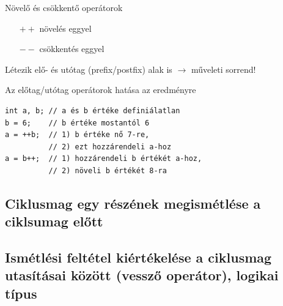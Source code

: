 \documentclass[usenames,dvipsnames,aspectratio=169]{beamer}
\begin{document}
\begin{frame}[fragile]
  Növelő és csökkentő operátorok
  \begin{itemize}
    \item[\texttt{$++$}] növelés eggyel
    \item[\texttt{$--$}] csökkentés eggyel
  \end{itemize}
  Létezik elő- és utótag (prefix/postfix) alak is $\to$ műveleti sorrend!
  \vfill
  \begin{block}{Az előtag/utótag operátorok hatása az eredményre}
    \vspace{-.3cm}
    \begin{verbatim}
int a, b; // a és b értéke definiálatlan
b = 6;    // b értéke mostantól 6
a = ++b;  // 1) b értéke nő 7-re, 
          // 2) ezt hozzárendeli a-hoz
a = b++;  // 1) hozzárendeli b értékét a-hoz,
          // 2) növeli b értékét 8-ra
    \end{verbatim}
    \vspace{-.6cm}
  \end{block}
\end{frame}

\subsection{Ciklusmag egy részének megismétlése a ciklsumag előtt}
\begin{frame}
  \begin{exampleblock}{}
    \vspace{-.2cm}
    
    \vspace{-.2cm}
  \end{exampleblock}
\end{frame}

\subsection{Ismétlési feltétel kiértékelése a ciklusmag utasításai között (vessző operátor), logikai típus}
\begin{frame}
  \scriptsize
  \begin{exampleblock}{}
    
  \end{exampleblock}
\end{frame}
\end{document}
